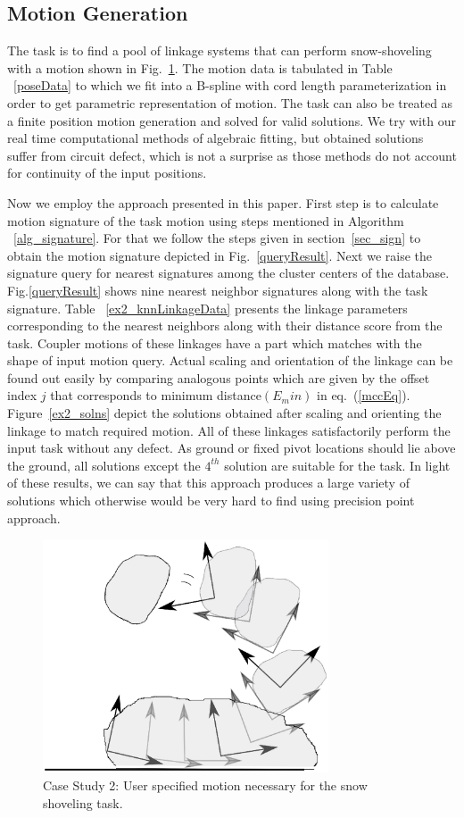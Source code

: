 \documentclass[twocolumn,10pt]{asme2e}
\newcommand{\req}[1]{(\ref{#1})}
\begin{document}
\subsection{Motion Generation}
The task is to find a pool of linkage systems that can perform snow-shoveling with a motion shown in Fig.~\ref{motionQuery}.
The motion data is tabulated in Table ~\ref{poseData} to which we fit into a B-spline with cord length parameterization in order to get parametric representation of motion.
The task can also be treated as a finite position motion generation and solved for valid solutions.
We try with our real time computational methods of algebraic fitting\cite{generalfitting-JCISE},\cite{deshpande2017} but obtained solutions suffer from circuit defect, which is not a surprise as those methods do not account for continuity of the input positions.

Now we employ the approach presented in this paper.
First step is to calculate motion signature of the task motion using steps mentioned in Algorithm ~\ref{alg_signature}.
For that we follow the steps given in section~\ref{sec_sign} to obtain the motion signature depicted in Fig.~\ref{queryResult}.
Next we raise the signature query for nearest signatures among the cluster centers of the database.
Fig.\ref{queryResult} shows nine nearest neighbor signatures along with the task signature.
Table ~\ref{ex2_knnLinkageData} presents the linkage parameters corresponding to the nearest neighbors along with their distance score from the task.
Coupler motions of these linkages have a part which matches with the shape of input motion query.
Actual scaling and orientation of the linkage can be found out easily by comparing analogous points which are given by the offset index $j$ that corresponds to minimum distance$(E_min)$ in eq.~\req{mccEq}.
Figure~\ref{ex2_solns} depict the solutions obtained after scaling and orienting the linkage to match required motion.
All of these linkages satisfactorily perform the input task without any defect.
As ground or fixed pivot locations should lie above the ground, all solutions except the $4^{th}$ solution are suitable for the task.
In light of these results, we can say that this approach produces a large variety of solutions which otherwise would be very hard to find using precision point approach.

\begin{figure}
\centering
\includegraphics[width=240pt]{figure/fig_motion_query.eps}
  \caption{Case Study 2: User specified motion necessary for the snow shoveling task.}
\label{motionQuery}
\end{figure}
\end{document}
